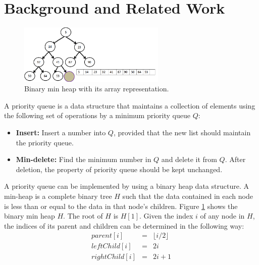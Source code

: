 \section{Background and Related Work}
\label{s:background}

\begin{figure}[!ht]
  \centering
  \includegraphics[width=7cm]{fig/fig2.png}
      \caption{Binary min heap with its array representation.}
    \label{fig2}
\end{figure}

A priority queue is a data structure that maintains a collection of elements using the following set of operations by a minimum priority queue $Q$:
\begin{itemize}
\item {\bf Insert:} Insert a number into $Q$, provided that the new list should maintain the priority queue.

\item {\bf Min-delete:} Find the minimum number in $Q$ and delete it from $Q$. After deletion, the property of priority queue should be kept unchanged.
\end{itemize}


A priority queue can be implemented by using a binary heap data structure.
A min-heap is a complete binary tree $H$ such that the data contained in each node is less than or equal to the data in that node's children.
Figure \ref{fig2} shows the binary min heap $H$.
The root of $H$ is $H[1]$.
Given the index $i$ of any node in $H$, the indices of its parent and children can be determined in the following way:
\begin{eqnarray*}
parent[i] &=&  \lfloor i/2 \rfloor \\
leftChild[i] &=& 2i\\
rightChild[i] &=& 2i + 1
\end{eqnarray*}

